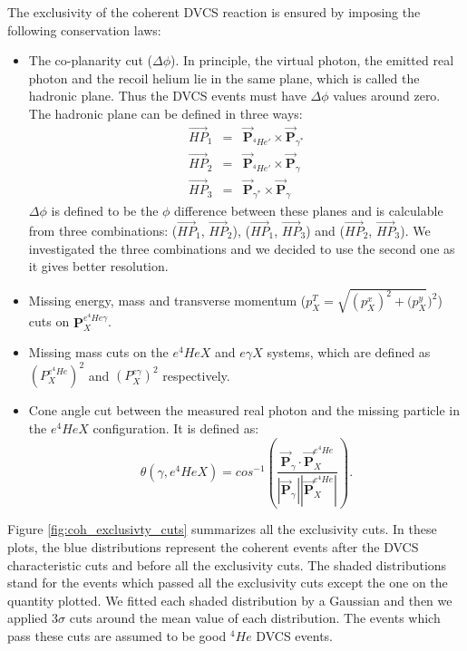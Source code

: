 The exclusivity of the coherent DVCS reaction is ensured by imposing the following conservation laws:
\begin{itemize}
\item The co-planarity cut ($\Delta \phi$). In principle, the virtual photon, the emitted real photon and the recoil helium lie in the same plane, which is called the hadronic plane. Thus the DVCS events must have $\Delta \phi$ values around zero. The hadronic plane can be defined in three ways:
\begin{eqnarray}
\overrightarrow{HP}_{1} &=& \overrightarrow{\mathbf{P}}_{^{4}He'} \times 
   \overrightarrow{\mathbf{P}}_{\gamma^{*}}\\
\overrightarrow{HP}_{2} &=& \overrightarrow{\mathbf{P}}_{^{4}He'}  \times 
   \overrightarrow{\mathbf{P}}_{\gamma}\\
\overrightarrow{HP}_{3} &=& \overrightarrow{\mathbf{P}}_{\gamma^{*}} \times 
   \overrightarrow{\mathbf{P}}_{\gamma}
\end{eqnarray}
$\Delta \phi$ is defined to be the $\phi$ difference between these planes and 
is calculable from three combinations: ($\overrightarrow{HP}_{1}$, 
$\overrightarrow{HP}_{2}$), ($\overrightarrow{HP}_{1}$, 
$\overrightarrow{HP}_{3}$) and ($\overrightarrow{HP}_{2}$, 
$\overrightarrow{HP}_{3}$). We investigated the three combinations and we 
decided to use the second one as it gives better resolution.

\item Missing energy, mass and transverse momentum ($p^{T}_{X} = 
   \sqrt{(p^{x}_{X})^2 + (p^{y}_{X}})^2$) cuts on 
   $\mathbf{P}^{e^{4}He\gamma}_{X}$.

\item Missing mass cuts on the $e^{4}HeX$ and $e\gamma X$ systems, which are 
   defined as $(P^{e^{4}He}_{X})^{2}$ and $(P^{e\gamma}_{X})^{2}$ respectively.

\item Cone angle cut between the measured real photon and the missing particle 
   in the $e^{4}HeX$ configuration. It is defined as:
\begin{equation}
\theta(\gamma, e^{4}HeX) = cos^{-1} \left( 
\frac{\overrightarrow{\mathbf{P}}_{\gamma} \cdot 
\overrightarrow{\mathbf{P}}^{e^{4}He}_{X}}{|\overrightarrow{\mathbf{P}}_{\gamma^{}}| 
|\overrightarrow{\mathbf{P}}^{e^{4}He}_{X}|}   \right).
\end{equation}
\end{itemize}
Figure \ref{fig:coh_exclusivty_cuts} summarizes all the exclusivity cuts.  
In these plots, the blue distributions represent the coherent events after the 
DVCS characteristic cuts and before all the exclusivity cuts. The shaded 
distributions stand for the events which passed all the exclusivity cuts except 
the one on the quantity plotted. We fitted each shaded distribution by a 
Gaussian and then we applied  3$\sigma$ cuts around the mean value of each 
distribution. The events which pass these cuts are assumed to be good $^{4}He$ 
DVCS events. 


